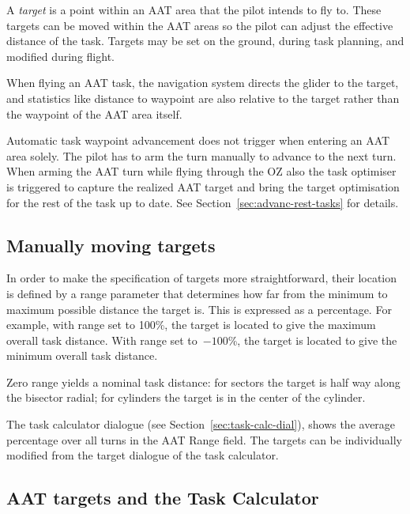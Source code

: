 A {\em target} is a point within an AAT area that the pilot intends to
fly to.  These targets can be moved within the AAT areas so the pilot
can adjust the effective distance of the task.  Targets may be set on
the ground, during task planning, and modified during flight.

When flying an AAT task, the navigation system directs the glider to
the target, and statistics like distance to waypoint are also relative
to the target rather than the waypoint of the AAT area itself.

Automatic task waypoint advancement does not trigger when entering an
AAT area solely. The pilot has to arm the turn manually to advance to the next
turn. When arming the AAT turn while flying through the OZ also the task
optimiser is triggered to capture the realized AAT target and bring the target
optimisation for the rest of the task up to date. See Section~\ref{sec:advanc-rest-tasks} 
for details.

\subsection*{Manually moving targets}

In order to make the specification of targets more straightforward,
their location is defined by a range parameter that determines how
far from the minimum to maximum possible distance the target is.  This
is expressed as a percentage.  For example, with range set to 100\%,
the target is located to give the maximum overall task distance.  With
range set to~$-100$\%, the target is located to give the minimum overall
task distance.  

Zero range yields a nominal task distance: for sectors the target is
half way along the bisector radial; for cylinders the target is in the
center of the cylinder.

The task calculator dialogue (see Section~\ref{sec:task-calc-dial}), shows the
average percentage over all turns in the AAT Range field.
The targets can be individually modified from the target dialogue of the task
calculator.


\subsection*{AAT targets and the Task Calculator}

